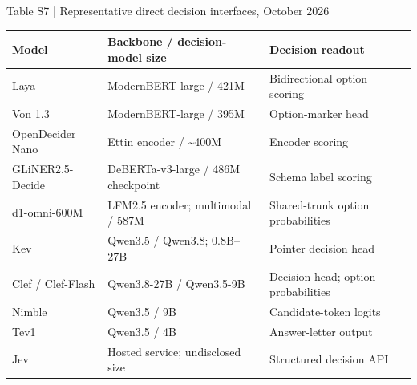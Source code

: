 \documentclass[10pt]{article}
\begin{document}
\begin{center}
\begin{minipage}{\textwidth}
\fontsize{8.5}{10.3}\selectfont
Table S7 | Representative direct decision interfaces, October 2026
\par\vspace{4pt}
\begin{tabularx}{\textwidth}{@{}XXX@{}}
\toprule
Model & Backbone / decision-model size & Decision readout \\
\midrule
Laya & ModernBERT-large / 421M & Bidirectional option scoring \\
Von 1.3 & ModernBERT-large / 395M & Option-marker head \\
OpenDecider Nano & Ettin encoder / \textasciitilde{}400M & Encoder scoring \\
GLiNER2.5-Decide & DeBERTa-v3-large / 486M checkpoint & Schema label scoring \\
d1-omni-600M & LFM2.5 encoder; multimodal / 587M & Shared-trunk option probabilities \\
Kev & Qwen3.5 / Qwen3.8; 0.8B–27B & Pointer decision head \\
Clef / Clef-Flash & Qwen3.8-27B / Qwen3.5-9B & Decision head; option probabilities \\
Nimble & Qwen3.5 / 9B & Candidate-token logits \\
Tev1 & Qwen3.5 / 4B & Answer-letter output \\
Jev & Hosted service; undisclosed size & Structured decision API \\
\bottomrule
\end{tabularx}
\par{}
\end{minipage}
\end{center}
\end{document}
